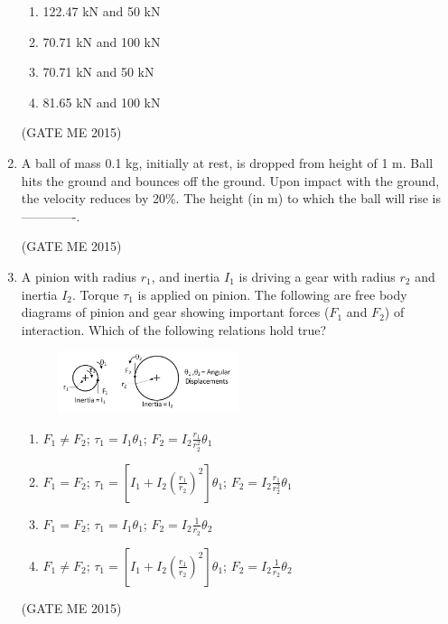 \documentclass[journal]{IEEEtran}
\begin{document}
\begin{enumerate}
\begin{multicols}{2}
\begin{enumerate}
    \item 122.47 kN and 50 kN
    \item 70.71 kN and 100 kN
    \item 70.71 kN and 50 kN
    \item 81.65 kN and 100 kN
\end{enumerate}
\end{multicols}
\hfill  (GATE ME 2015)

\item A ball of mass 0.1 kg, initially at rest, is dropped from height of 1 m. Ball hits the ground and bounces off the ground. Upon impact with the ground, the velocity reduces by 20\%. The height (in m) to which the ball will rise is -------------.

\hfill  (GATE ME 2015)

\item A pinion with radius $ r_1 $, and inertia $ I_1 $ is driving a gear with radius $ r_2 $ and inertia $ I_2 $. Torque $ \tau_1 $ is applied on pinion. The following are free body diagrams of pinion and gear showing important forces ($ F_1 $ and $ F_2 $) of interaction. Which of the following relations hold true?

\begin{figure}[H]
\centering
\includegraphics[width=0.5\textwidth]{Fig 17.png}
\caption{}
\label{fig:question51}
\end{figure}

\begin{enumerate}
    \item $ F_1 \neq F_2 $; $ \tau_1 = I_1 \theta_1 $; $ F_2 = I_2 \frac{r_1}{r_2^2} \theta_1 $
    \item $ F_1 = F_2 $; $ \tau_1 = \left[ I_1 + I_2 \left( \frac{r_1}{r_2} \right)^2 \right] \theta_1 $; $ F_2 = I_2 \frac{r_1}{r_2^2} \theta_1 $
    \item $ F_1 = F_2 $; $ \tau_1 = I_1 \theta_1 $; $ F_2 = I_2 \frac{1}{r_2} \theta_2 $
    \item $ F_1 \neq F_2 $; $ \tau_1 = \left[ I_1 + I_2 \left( \frac{r_1}{r_2} \right)^2 \right] \theta_1 $; $ F_2 = I_2 \frac{1}{r_2} \theta_2 $
\end{enumerate}
\hfill  (GATE ME 2015)


\end{enumerate}
\end{document}
